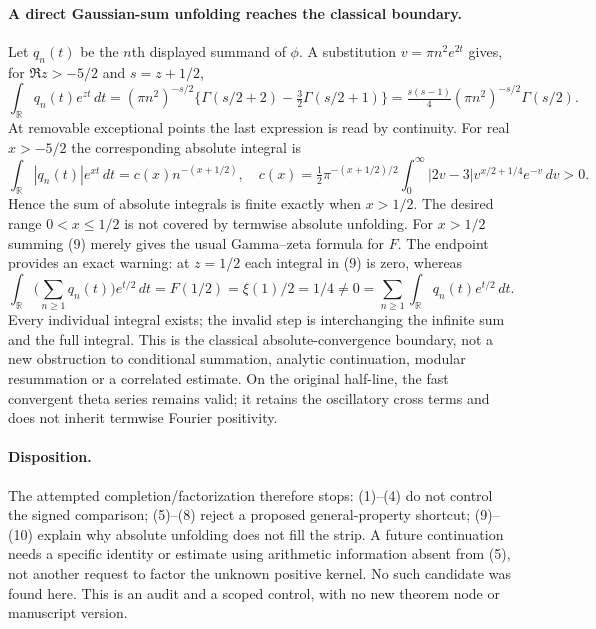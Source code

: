 \paragraph{A direct Gaussian-sum unfolding reaches the classical boundary.}
Let $q_n(t)$ be the $n$th displayed summand of $\phi$. A substitution
$v=\pi n^2e^{2t}$ gives, for $\Re z>-5/2$ and $s=z+1/2$,
\[
 \int_{\mathbb R}q_n(t)e^{zt}\,dt
  =(\pi n^2)^{-s/2}
    \{\Gamma(s/2+2)-\tfrac32\Gamma(s/2+1)\}
  =\tfrac{s(s-1)}4(\pi n^2)^{-s/2}\Gamma(s/2).             \tag{9}
\]
At removable exceptional points the last expression is read by continuity.
For real $x>-5/2$ the corresponding absolute integral is
\[
 \int_{\mathbb R}|q_n(t)|e^{xt}\,dt
   =c(x)n^{-(x+1/2)},\quad
 c(x)=\tfrac12\pi^{-(x+1/2)/2}
       \int_0^\infty |2v-3|v^{x/2+1/4}e^{-v}\,dv>0.     \tag{10}
\]
Hence the sum of absolute integrals is finite exactly when $x>1/2$.
The desired range $0<x\le1/2$ is not covered by termwise absolute
unfolding. For $x>1/2$ summing (9) merely gives the usual Gamma--zeta
formula for $F$. The endpoint provides an exact warning: at $z=1/2$
each integral in (9) is zero, whereas
\[
 \int_{\mathbb R}\Big(\sum_{n\ge1}q_n(t)\Big)e^{t/2}\,dt
     =F(1/2)=\xi(1)/2=1/4\ne0
     =\sum_{n\ge1}\int_{\mathbb R}q_n(t)e^{t/2}\,dt.      \tag{11}
\]
Every individual integral exists; the invalid step is interchanging the
infinite sum and the full integral. This is the classical absolute-convergence boundary,
not a new obstruction to conditional summation, analytic continuation,
modular resummation or a correlated estimate. On the original half-line,
the fast convergent theta series remains valid; it retains the oscillatory
cross terms and does not inherit termwise Fourier positivity.

\paragraph{Disposition.}
The attempted completion/factorization therefore stops: (1)--(4) do not
control the signed comparison; (5)--(8) reject a proposed general-property
shortcut; (9)--(10) explain why absolute unfolding does not fill the strip.
A future continuation needs a specific identity or estimate using
arithmetic information absent from (5), not another request to factor the
unknown positive kernel. No such candidate was found here. This is an audit
and a scoped control, with no new theorem node or manuscript version.
